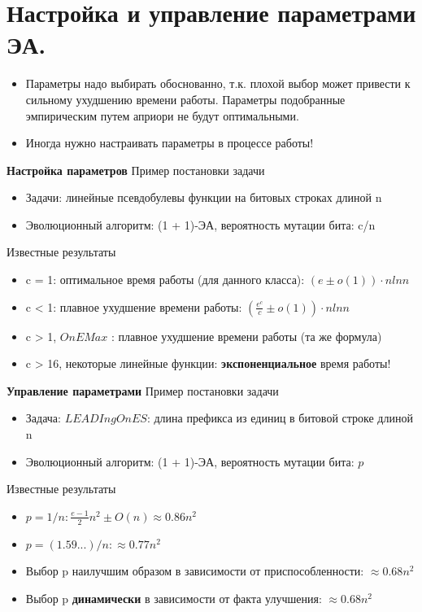 \section{Настройка и управление параметрами ЭА.}

\begin{itemize}
    \item Параметры надо выбирать обоснованно, т.к. плохой выбор может привести к сильному ухудшению времени работы. Параметры подобранные эмпирическим путем априори не будут оптимальными.
    \item Иногда нужно настраивать параметры в процессе работы!
\end{itemize}

\textbf{Настройка параметров}
Пример постановки задачи
\begin{itemize}
    \item Задачи: линейные псевдобулевы функции на битовых строках длиной n 
    \item Эволюционный алгоритм: (1 + 1)-ЭА, вероятность мутации бита: c/n
\end{itemize}

Известные результаты
\begin{itemize}
    \item c = 1: оптимальное время работы (для данного класса): $(e ± o(1)) · n ln n $
    \item c < 1: плавное ухудшение времени работы: $( \frac{e^c}{c} ± o(1)) · n ln n$
    \item c > 1, $OnEMax$ : плавное ухудшение времени работы (та же формула)
    \item c > 16, некоторые линейные функции: \textbf{экспоненциальное} время работы! 
\end{itemize}


\textbf{Управление параметрами}
Пример постановки задачи
\begin{itemize}
    \item Задача: $LEADIngOnES$: длина префикса из единиц в битовой строке длиной n 
    \item Эволюционный алгоритм: (1 + 1)-ЭА, вероятность мутации бита: $p$
\end{itemize}

Известные результаты
\begin{itemize}
    \item $p = 1/n: \frac{e-1}{2} n^2 ± O(n) ≈ 0.86n^2$
    \item $p = (1.59...)/n: ≈ 0.77n^2$
    \item Выбор p наилучшим образом в зависимости от приспособленности: \textbf{$≈ 0.68n^2$}
    \item Выбор p \textbf{динамически} в зависимости от факта улучшения: \textbf{$≈ 0.68n^2$}
\end{itemize}


